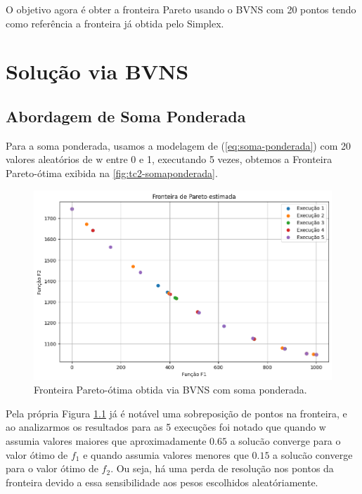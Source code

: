 \documentclass[
	12pt,				%
	oneside,			%
	a4paper,			%
	chapter=TITLE,
	sumario=tradicional,
	english,			%
	brazil				%
]{abntex2}
\begin{document}
O objetivo agora é obter a fronteira Pareto usando o BVNS com 20 pontos
tendo como referência a 
fronteira já obtida pelo Simplex.

\chapter{Solução via BVNS}\label{cap:bnvs} 

\section{Abordagem de Soma Ponderada}

Para a soma ponderada, usamos a modelagem de (\ref{eq:soma-ponderada})
com 20 valores aleatórios de $\mathrm{w}$ entre 0 e 1, 
executando 5 vezes, obtemos a Fronteira Pareto-ótima exibida na 
\autoref{fig:tc2-somaponderada}.

\begin{figure}[h!]
	\caption{\label{fig:tc2-somaponderada}Fronteira Pareto-ótima obtida via BVNS com soma ponderada.}
	\begin{center}
    \includegraphics[width=\textwidth,trim=1 1 1 1,clip]{tc2-somaponderada.png}
	\end{center}
\end{figure}

Pela própria Figura \ref{fig:tc2-somaponderada} já é notável uma sobreposição de pontos na fronteira, e ao analizarmos os resultados para as 5 execuções foi notado que
quando $\mathrm{w}$ assumia valores maiores que aproximadamente $0.65$ a solucão converge para o valor ótimo de $f_1$ e quando assumia valores menores que $0.15$
a solucão converge para o valor ótimo de $f_2$. Ou seja, há uma perda de resolução nos pontos da fronteira devido a essa sensibilidade aos pesos escolhidos aleatóriamente.
\end{document}
